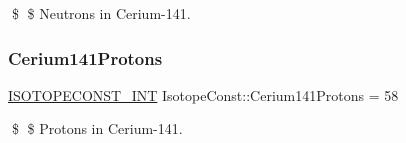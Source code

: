 \$ \$ Neutrons in Cerium-\/141. \mbox{\label{group___isotope_const-_cerium-_ce141_ga03f8a151cf4e3c49910cdf00d6de5948}} 
\subsubsection{\texorpdfstring{Cerium141\+Protons}{Cerium141Protons}}
{\footnotesize\ttfamily \mbox{\hyperlink{group___isotope_const-_macros_ga5f18360b3e99483a35c32d789e62621c}{I\+S\+O\+T\+O\+P\+E\+C\+O\+N\+S\+T\+\_\+\+I\+NT}} Isotope\+Const\+::\+Cerium141\+Protons = 58}

\$ \$ Protons in Cerium-\/141. 